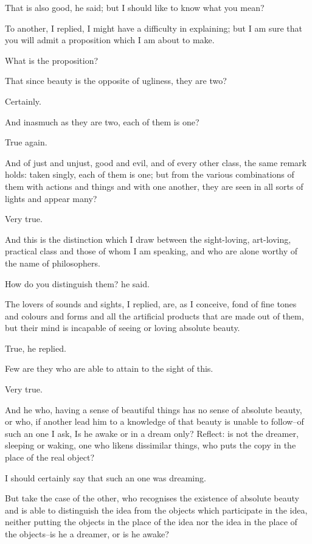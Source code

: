 That is also good, he said; but I should like to know what you mean?

To another, I replied, I might have a difficulty in explaining; but I am
sure that you will admit a proposition which I am about to make.

What is the proposition?

That since beauty is the opposite of ugliness, they are two?

Certainly.

And inasmuch as they are two, each of them is one?

True again.

And of just and unjust, good and evil, and of every other class, the
same remark holds: taken singly, each of them is one; but from the
various combinations of them with actions and things and with one
another, they are seen in all sorts of lights and appear many?

Very true.

And this is the distinction which I draw between the sight-loving,
art-loving, practical class and those of whom I am speaking, and who are
alone worthy of the name of philosophers.

How do you distinguish them? he said.

The lovers of sounds and sights, I replied, are, as I conceive, fond of
fine tones and colours and forms and all the artificial products that
are made out of them, but their mind is incapable of seeing or loving
absolute beauty.

True, he replied.

Few are they who are able to attain to the sight of this.

Very true.

And he who, having a sense of beautiful things has no sense of absolute
beauty, or who, if another lead him to a knowledge of that beauty is
unable to follow--of such an one I ask, Is he awake or in a dream
only? Reflect: is not the dreamer, sleeping or waking, one who likens
dissimilar things, who puts the copy in the place of the real object?

I should certainly say that such an one was dreaming.

But take the case of the other, who recognises the existence of absolute
beauty and is able to distinguish the idea from the objects which
participate in the idea, neither putting the objects in the place of the
idea nor the idea in the place of the objects--is he a dreamer, or is he
awake?

